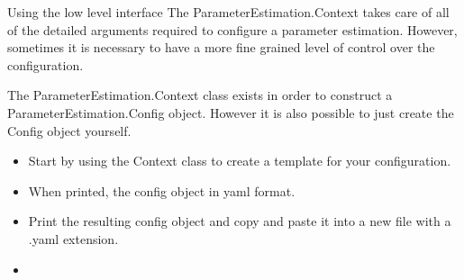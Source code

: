\documentclass[../../main]{subfiles}
\begin{document}
\begin{Task}[label=AdvancedInterface]{Using the low level interface}
    The ParameterEstimation.Context takes care of all of the detailed arguments required
    to configure a parameter estimation. However, sometimes it is necessary to have a more
    fine grained level of control over the configuration.

    The ParameterEstimation.Context class exists in order to construct a ParameterEstimation.Config object.
    However it is also possible to just create the Config object yourself.
    \begin{itemize}
        \item Start by using the Context class to create a template for your configuration.
        \item When printed, the config object in yaml format.
        \item Print the resulting config object and copy and paste it into a new file with a .yaml extension.
        \item
    \end{itemize}

\end{Task}
\end{document}
